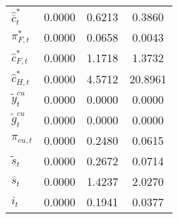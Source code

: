 \begin{center}
\begin{longtable}{lccc}
${\hat {\bar c}_t^*}  $	 & 	       0.0000	 & 	       0.6213	 & 	       0.3860 \\ 
${\pi_{F,t}^*}        $	 & 	       0.0000	 & 	       0.0658	 & 	       0.0043 \\ 
${\hat c_{F,t}^*}     $	 & 	       0.0000	 & 	       1.1718	 & 	       1.3732 \\ 
${\hat c_{H,t}^*}     $	 & 	       0.0000	 & 	       4.5712	 & 	      20.8961 \\ 
${\tilde y_t^{cu}}    $	 & 	       0.0000	 & 	       0.0000	 & 	       0.0000 \\ 
${\tilde g_t^{cu}}    $	 & 	       0.0000	 & 	       0.0000	 & 	       0.0000 \\ 
${\pi_{cu,t}}         $	 & 	       0.0000	 & 	       0.2480	 & 	       0.0615 \\ 
${\tilde s_t}         $	 & 	       0.0000	 & 	       0.2672	 & 	       0.0714 \\ 
${\bar s_t}           $	 & 	       0.0000	 & 	       1.4237	 & 	       2.0270 \\ 
${i_t}                $	 & 	       0.0000	 & 	       0.1941	 & 	       0.0377 \\ 
\end{longtable}
 \end{center}

